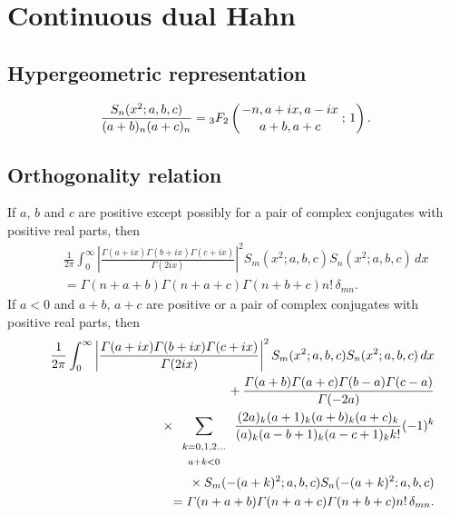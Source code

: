 \documentclass[envcountchap,graybox]{svmono}
\newcommand{\hyp}[5]{\mbox{}_{#1}{F}_{#2}
\left(\genfrac{}{}{0pt}{}{#3}{#4}\,;\,#5\right)}
\newcommand{\mathindent}{\hspace{7.5mm}}
\renewcommand{\Gamma}{\varGamma}
\begin{document}
\section{Continuous dual Hahn}

\par\setcounter{equation}{0}

\subsection*{Hypergeometric representation}
\begin{equation}
\label{DefContDualHahn}
\frac{S_n(x^2;a,b,c)}{(a+b)_n(a+c)_n}=\hyp{3}{2}{-n,a+ix,a-ix}{a+b,a+c}{1}.
\end{equation}

\subsection*{Orthogonality relation}
If $a$, $b$ and $c$ are positive except possibly for a pair of complex conjugates with positive real parts, then
\begin{eqnarray}
\label{OrtIContDualHahn}
& &\frac{1}{2\pi}\int_0^{\infty}\left|\frac{\Gamma(a+ix)\Gamma(b+ix)\Gamma(c+ix)}{\Gamma(2ix)}\right|^2
S_m(x^2;a,b,c)S_n(x^2;a,b,c)\,dx\nonumber\\
& &{}=\Gamma(n+a+b)\Gamma(n+a+c)\Gamma(n+b+c)n!\,\delta_{mn}.
\end{eqnarray}
If $a<0$ and $a+b$, $a+c$ are positive or a pair of complex conjugates
with positive real parts, then
\begin{eqnarray}
\label{OrtIIContDualHahn}
& &\frac{1}{2\pi}\int_0^{\infty}\left|\frac{\Gamma(a+ix)\Gamma(b+ix)\Gamma(c+ix)}{\Gamma(2ix)}\right|^2
S_m(x^2;a,b,c)S_n(x^2;a,b,c)\,dx\nonumber\\
& &{}\mathindent{}+\frac{\Gamma(a+b)\Gamma(a+c)\Gamma(b-a)\Gamma(c-a)}{\Gamma(-2a)}\nonumber\\
& &{}\mathindent\mathindent{}\times\sum_{\begin{array}{c}
{\scriptstyle k=0,1,2\ldots}\\{\scriptstyle a+k<0}\end{array}}
\frac{(2a)_k(a+1)_k(a+b)_k(a+c)_k}{(a)_k(a-b+1)_k(a-c+1)_kk!}(-1)^k\nonumber\\
& &{}\mathindent\mathindent\mathindent\mathindent{}\times S_m(-(a+k)^2;a,b,c)S_n(-(a+k)^2;a,b,c)\nonumber\\
& &{}=\Gamma(n+a+b)\Gamma(n+a+c)\Gamma(n+b+c)n!\,\delta_{mn}.
\end{eqnarray}
\end{document}
